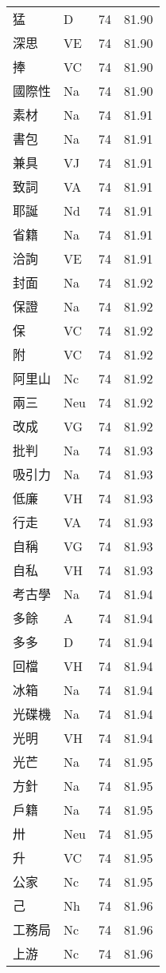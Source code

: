 \documentclass[twocolumn]{book}
\begin{document}
\begin{supertabular}{llrr}
猛 & D & 74 &  81.90\\
深思 & VE & 74 &  81.90\\
捧 & VC & 74 &  81.90\\
國際性 & Na & 74 &  81.90\\
素材 & Na & 74 &  81.91\\
書包 & Na & 74 &  81.91\\
兼具 & VJ & 74 &  81.91\\
致詞 & VA & 74 &  81.91\\
耶誕 & Nd & 74 &  81.91\\
省籍 & Na & 74 &  81.91\\
洽詢 & VE & 74 &  81.91\\
封面 & Na & 74 &  81.92\\
保證 & Na & 74 &  81.92\\
保 & VC & 74 &  81.92\\
附 & VC & 74 &  81.92\\
阿里山 & Nc & 74 &  81.92\\
兩三 & Neu & 74 &  81.92\\
改成 & VG & 74 &  81.92\\
批判 & Na & 74 &  81.93\\
吸引力 & Na & 74 &  81.93\\
低廉 & VH & 74 &  81.93\\
行走 & VA & 74 &  81.93\\
自稱 & VG & 74 &  81.93\\
自私 & VH & 74 &  81.93\\
考古學 & Na & 74 &  81.94\\
多餘 & A & 74 &  81.94\\
多多 & D & 74 &  81.94\\
回檔 & VH & 74 &  81.94\\
冰箱 & Na & 74 &  81.94\\
光碟機 & Na & 74 &  81.94\\
光明 & VH & 74 &  81.94\\
光芒 & Na & 74 &  81.95\\
方針 & Na & 74 &  81.95\\
戶籍 & Na & 74 &  81.95\\
卅 & Neu & 74 &  81.95\\
升 & VC & 74 &  81.95\\
公家 & Nc & 74 &  81.95\\
己 & Nh & 74 &  81.96\\
工務局 & Nc & 74 &  81.96\\
上游 & Nc & 74 &  81.96\\

\end{supertabular}
\end{document}
